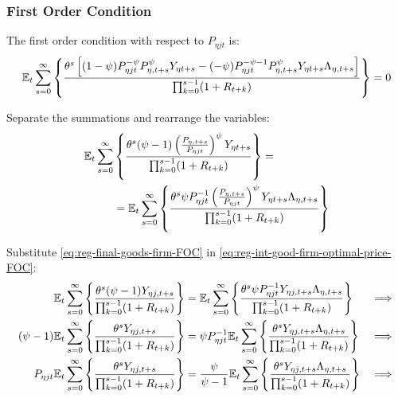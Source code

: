 \documentclass[../thesis.tex]{subfiles}
\begin{document}

\subsubsection*{First Order Condition}

The first order condition with respect to $P_{\eta jt}$ is:
\begin{align}
	& \quad {\mathbb{E}_{t}} \sum_{s=0}^{\infty} \left\{ \frac{\theta^s \left[ (1-\psi) P_{\eta jt}^{-\psi} P_{\eta, t+s}^{\psi} Y_{\eta t+s} - (-\psi) P_{\eta jt}^{-\psi-1} P_{\eta, t+s}^{\psi} Y_{\eta t+s} \Lambda_{\eta, t+s} \right]}{\prod_{k=0}^{s-1}(1+R_{t+k})} \right\} = 0 \nonumber
\end{align}


Separate the summations and rearrange the variables:
\begin{align}
	\begin{split}
		{\mathbb{E}_{t}} \sum_{s=0}^{\infty} &\left\{ \frac{\theta^s (\psi-1) \left( \frac{P_{\eta, t+s}} {P_{\eta jt}} \right)^{\psi} Y_{\eta t+s}} {\prod_{k=0}^{s-1} (1+R_{t+k})} \right\} = \\
		&= {\mathbb{E}_{t}} \sum_{s=0}^{\infty} \left\{ \frac{\theta^s \psi P_{\eta jt}^{-1} \left( \frac{P_{\eta, t+s}} {P_{\eta jt}} \right)^{\psi} Y_{\eta t+s} \Lambda_{\eta, t+s}}{\prod_{k=0}^{s-1}(1+R_{t+k})} \right\} \label{eq:reg-int-good-firm-optimal-price-FOC}
	\end{split}
\end{align}


Substitute \ref{eq:reg-final-goods-firm-FOC} in \ref{eq:reg-int-good-firm-optimal-price-FOC}:
\begin{alignat}{2}
	{\mathbb{E}_{t}} \sum_{s=0}^{\infty} \Bigg\{ \frac{\theta^s (\psi-1) Y_{\eta j,t+s}}{\prod_{k=0}^{s-1}(1+R_{t+k})} \Bigg\} &= {\mathbb{E}_{t}} \sum_{s=0}^{\infty} \Bigg\{ \frac{\theta^s \psi P_{\eta jt}^{-1} Y_{\eta j,t+s} \Lambda_{\eta, t+s}}{\prod_{k=0}^{s-1}(1+R_{t+k})}  \Bigg\} &\implies \nonumber \\
	(\psi-1) {\mathbb{E}_{t}} \sum_{s=0}^{\infty} \Bigg\{ \frac{\theta^s Y_{\eta j,t+s}}{\prod_{k=0}^{s-1}(1+R_{t+k})} \Bigg\} &= \psi P_{\eta jt}^{-1} {\mathbb{E}_{t}} \sum_{s=0}^{\infty} \Bigg\{ \frac{\theta^s Y_{\eta j,t+s} \Lambda_{\eta, t+s}}{\prod_{k=0}^{s-1}(1+R_{t+k})}  \Bigg\} &\implies \nonumber \\
	P_{\eta jt} {\mathbb{E}_{t}} \sum_{s=0}^{\infty} \Bigg\{ \frac{\theta^s Y_{\eta j,t+s}}{\prod_{k=0}^{s-1}(1+R_{t+k})} \Bigg\} &= \frac{\psi}{\psi-1} {\mathbb{E}_{t}} \sum_{s=0}^{\infty} \Bigg\{ \frac{\theta^s Y_{\eta j,t+s} \Lambda_{\eta, t+s}}{\prod_{k=0}^{s-1}(1+R_{t+k})}  \Bigg\} &\implies \nonumber
\end{alignat}
\end{document}
